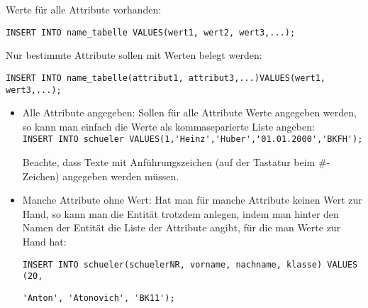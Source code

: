 \begin{tcolorbox}[title=Befüllen einer Tabelle]
    Werte für alle Attribute vorhanden:

	\lstinline!INSERT INTO name_tabelle VALUES(wert1, wert2, wert3,...);!

    Nur bestimmte Attribute sollen mit Werten belegt werden:

    \lstinline!INSERT INTO name_tabelle(attribut1, attribut3,...)VALUES(wert1, wert3,...);!
\end{tcolorbox}
\begin{itemize}
	\item Alle Attribute angegeben: Sollen für alle Attribute Werte angegeben werden, so kann man einfach die Werte als kommaseparierte Liste angeben:\\
	\lstinline!INSERT INTO schueler VALUES(1,'Heinz','Huber','01.01.2000','BKFH');!

	Beachte, dass Texte mit Anführungszeichen (auf der Tastatur beim \#-Zeichen) angegeben werden müssen.
	\item Manche Attribute ohne Wert: Hat man für manche Attribute keinen Wert zur Hand, so kann man die Entität trotzdem anlegen, indem man hinter den Namen der Entität die Liste der Attribute angibt, für die man Werte zur Hand hat:

	\lstinline!INSERT INTO schueler(schuelerNR, vorname, nachname, klasse) VALUES (20,!

	\lstinline!'Anton', 'Atonovich', 'BK11');!
\end{itemize}

